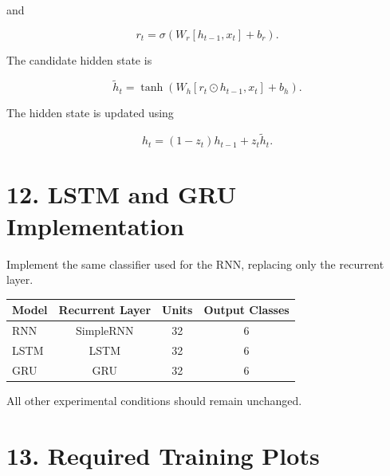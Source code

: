 \documentclass[10pt]{article}
\begin{document}
and

\[
r_t=\sigma(W_r[h_{t-1},x_t]+b_r).
\]

The candidate hidden state is

\[
\tilde{h}_t=
\tanh(W_h[r_t\odot h_{t-1},x_t]+b_h).
\]

The hidden state is updated using

\[
h_t=(1-z_t)h_{t-1}+z_t\tilde{h}_t.
\]

\begin{center}
\end{center}

\section*{12. LSTM and GRU Implementation}

Implement the same classifier used for the RNN, replacing only the recurrent
layer.

\begin{center}
\begin{tabular}{|l|c|c|c|}
\hline
Model & Recurrent Layer & Units & Output Classes\\
\hline
RNN & SimpleRNN & 32 & 6\\
LSTM & LSTM & 32 & 6\\
GRU & GRU & 32 & 6\\
\hline
\end{tabular}
\end{center}

All other experimental conditions should remain unchanged.

\section*{13. Required Training Plots}
\end{document}
